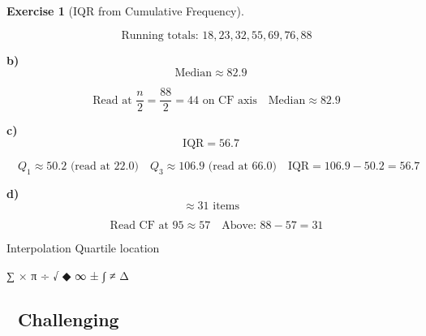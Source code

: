 \documentclass[
  letterpaper,
  DIV=11,
  numbers=noendperiod]{scrreprt}
\theoremstyle{definition}
\newtheorem{exercise}{Exercise}[chapter]
\theoremstyle{remark}
\begin{document}
\begin{exercise}[IQR from Cumulative
Frequency]
\begin{tcolorbox}
\[\quad \text{Running totals: }18, 23, 32, 55, 69, 76, 88\]

\textbf{b)} \[\text{Median} \approx 82.9\]

\[\quad \text{Read at }\frac{n}{2}=\frac{88}{2}=44\text{ on CF axis}\quad \text{Median}\approx82.9\]

\textbf{c)} \[\text{IQR} = 56.7\]

\[\quad Q_1\approx50.2\text{ (read at }22.0\text{)}\quad Q_3\approx106.9\text{ (read at }66.0\text{)}\quad \text{IQR}=106.9-50.2=56.7\]

\textbf{d)} \[\approx 31\text{ items}\]

\[\quad \text{Read CF at }95\approx57\quad \text{Above: }88-57=31\]

\end{tcolorbox}

{Interpolation} {Quartile location}

\end{exercise}

∑ × π ÷ √ ◆ ∞ ± ∫ ≠ Δ

\subsection{🔴 Challenging}
\end{document}
